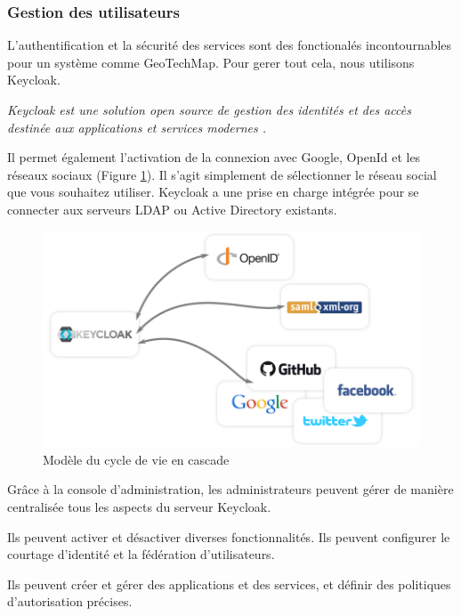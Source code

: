         \subsubsection{Gestion des utilisateurs}
        L'authentification et la sécurité des services sont des fonctionalés incontournables pour un système comme GeoTechMap.
        Pour gerer tout cela, nous utilisons Keycloak.
        \par 
        \textit{
                Keycloak est une solution open source de gestion des identités et des accès destinée aux applications 
                et services modernes \cite{keycloak}.} 
        \par 
        Il permet également l'activation de la connexion avec Google, OpenId et les réseaux sociaux (Figure \ref{fig:keycloak}).
        Il s'agit simplement de sélectionner le réseau social que vous souhaitez utiliser. 
        Keycloak a une prise en charge intégrée pour se connecter aux serveurs LDAP ou Active Directory existants.
        \begin{figure}[t]
                \centering
                \includegraphics[scale=0.3]{images/Implementation/keycloak.png}
                \caption{Modèle du cycle de vie en cascade \cite{keycloak}}
                \label{fig:keycloak}
        \end{figure}
        
        \par 
        Grâce à la console d'administration, les administrateurs peuvent gérer de manière centralisée tous les aspects du serveur Keycloak.

        Ils peuvent activer et désactiver diverses fonctionnalités. Ils peuvent configurer le courtage d'identité et la fédération d'utilisateurs.

        Ils peuvent créer et gérer des applications et des services, et définir des politiques d'autorisation précises.

